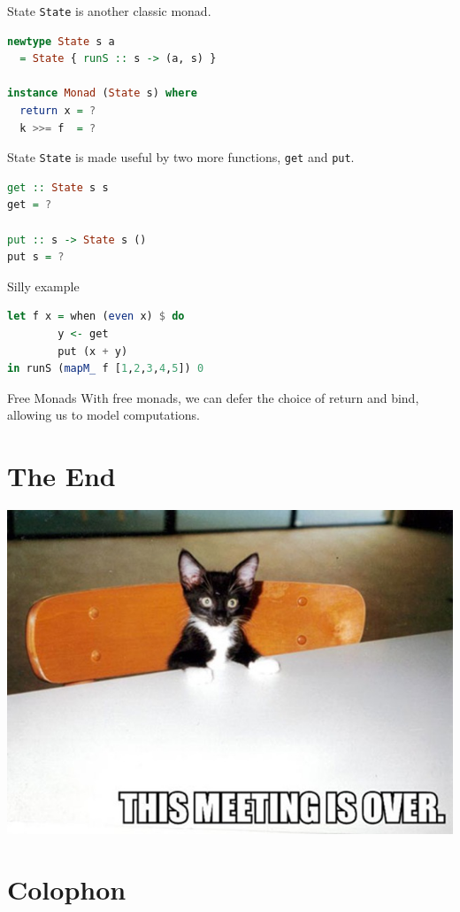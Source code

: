 \documentclass[utf8x,notes,17pt]{beamer}
\begin{document}
\begin{frame}[fragile,label=sec-16-28]{State}
\texttt{State} is another classic monad.
\begin{example}[\vspace*{-3.5ex}]
\begin{lstlisting}[language=Haskell]
newtype State s a
  = State { runS :: s -> (a, s) }

instance Monad (State s) where
  return x = ?
  k >>= f  = ?
\end{lstlisting}
\end{example}
\end{frame}
\begin{frame}[fragile,label=sec-16-29]{State}
\texttt{State} is made useful by two more functions, \texttt{get} and
\texttt{put}.
\begin{example}[\vspace*{-3.5ex}]
\begin{lstlisting}[language=Haskell]
get :: State s s
get = ?

put :: s -> State s ()
put s = ?
\end{lstlisting}
\end{example}
\end{frame}
\begin{frame}[fragile,label=sec-16-30]{Silly example}
\begin{example}[\vspace*{-3.5ex}]
\begin{lstlisting}[language=Haskell]
let f x = when (even x) $ do
        y <- get
        put (x + y)
in runS (mapM_ f [1,2,3,4,5]) 0
\end{lstlisting}
\end{example}
\end{frame}
\begin{frame}[fragile,label=sec-16-31]{Free Monads}
With free monads, we can defer the choice of return and bind, allowing us to
model computations.
\end{frame}
\section{The End}
\label{sec-17}
\begin{center}
\includegraphics[width=\linewidth]{images/this-meeting-is-over_3.jpg}
\end{center}
\section{Colophon}
\label{sec-18}
\end{document}

